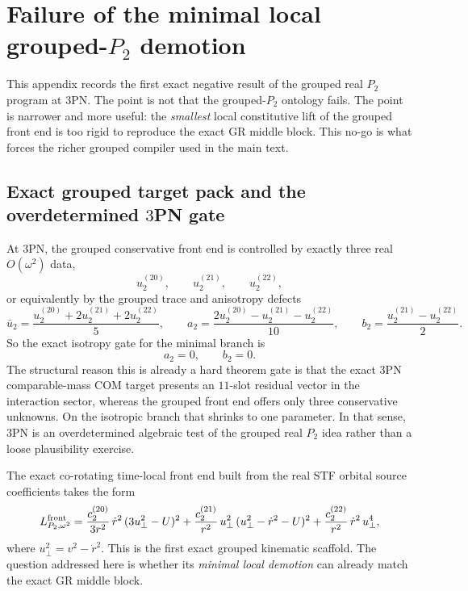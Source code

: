 \documentclass[11pt]{article}
\begin{document}
\section{Failure of the minimal local grouped-\texorpdfstring{$P_2$}{P 2} demotion}
\label{app:minimal_local_grouped_p2_demotion_failure}

This appendix records the first exact negative result of the grouped real $P_2$ program at $3$PN. The point is not that the grouped-$P_2$ ontology fails. The point is narrower and more useful: the \emph{smallest} local constitutive lift of the grouped front end is too rigid to reproduce the exact GR middle block. This no-go is what forces the richer grouped compiler used in the main text.

\subsection{Exact grouped target pack and the overdetermined \texorpdfstring{$3$}{3}PN gate}

At $3$PN, the grouped conservative front end is controlled by exactly three real $O(\omega^2)$ data,
\begin{equation}
  u_2^{(20)},\qquad u_2^{(21)},\qquad u_2^{(22)},
\end{equation}
or equivalently by the grouped trace and anisotropy defects
\begin{equation}
  \bar u_2 = \frac{u_2^{(20)} + 2u_2^{(21)} + 2u_2^{(22)}}{5},
  \qquad
  a_2 = \frac{2u_2^{(20)} - u_2^{(21)} - u_2^{(22)}}{10},
  \qquad
  b_2 = \frac{u_2^{(21)} - u_2^{(22)}}{2}.
\end{equation}
So the exact isotropy gate for the minimal branch is
\begin{equation}
  a_2 = 0,
  \qquad
  b_2 = 0.
\end{equation}
The structural reason this is already a hard theorem gate is that the exact $3$PN comparable-mass COM target presents an $11$-slot residual vector in the interaction sector, whereas the grouped front end offers only three conservative unknowns. On the isotropic branch that shrinks to one parameter. In that sense, $3$PN is an overdetermined algebraic test of the grouped real $P_2$ idea rather than a loose plausibility exercise.

The exact co-rotating time-local front end built from the real STF orbital source coefficients takes the form
\begin{equation}
  L_{P_2,\omega^2}^{\rm front}
  =
  \frac{c_2^{(20)}}{3r^2}\,\dot r^2\,(3u_\perp^2-U)^2
  +
  \frac{c_2^{(21)}}{r^2}\,u_\perp^2\,(u_\perp^2-\dot r^2-U)^2
  +
  \frac{c_2^{(22)}}{r^2}\,\dot r^2\,u_\perp^4,
\end{equation}
where $u_\perp^2=v^2-\dot r^2$. This is the first exact grouped kinematic scaffold. The question addressed here is whether its \emph{minimal local demotion} can already match the exact GR middle block.
\end{document}

